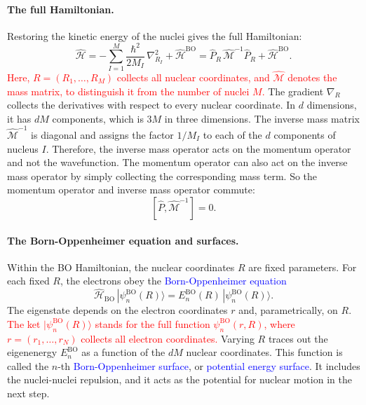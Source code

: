 \documentclass[11pt]{article}      %
\numberwithin{equation}{section}   %
\begin{document}
\paragraph{The full Hamiltonian.}
Restoring the kinetic energy of the nuclei gives the full Hamiltonian:
\begin{equation}
    \boxed{
        \hat{\mathcal{H}}
        = -\sum_{I=1}^{M}\frac{\hbar^2}{2M_I}\,\nabla_{R_I}^{2}
        +\hat{\mathcal{H}}^{\mathrm{BO}} 
        = \hat{P}_R\,\hat{\mathcal{M}}^{-1}\hat{P}_R
        +\hat{\mathcal{H}}^{\mathrm{BO}}.
    }
\end{equation}
\textcolor{red}{Here, $R=(R_1,\ldots,R_M)$ collects all nuclear coordinates,
and $\hat{\mathcal{M}}$ denotes the mass matrix, to distinguish it from the number of
nuclei $M$.} The gradient $\nabla_R$ collects the derivatives with respect to
every nuclear coordinate. In $d$ dimensions, it has $dM$ components, which is
$3M$ in three dimensions. The inverse mass matrix $\hat{\mathcal{M}}^{-1}$ is
diagonal and assigns the factor $1/M_I$ to each of the $d$ components of
nucleus $I$. Therefore, the inverse mass operator acts on the momentum operator and not the wavefunction. The momentum operator can also act on the inverse mass operator by simply collecting the corresponding mass term. So the momentum operator and inverse mass operator commute:
\begin{equation}
    \boxed{
        [\hat{P}, \hat{\mathcal{M}}^{-1}] = 0.
    }
\end{equation}

\paragraph{The Born-Oppenheimer equation and surfaces.}
Within the BO Hamiltonian, the nuclear coordinates $R$ are fixed parameters.
For each fixed $R$, the electrons obey the \textcolor{blue}{Born-Oppenheimer
equation}
\begin{equation}
    \boxed{\hat{\mathcal{H}}_{\mathrm{BO}}\,|\psi^{\mathrm{BO}}_n(R)\rangle
    = E^{\mathrm{BO}}_n(R)\,|\psi^{\mathrm{BO}}_n(R)\rangle.}
\end{equation}
The eigenstate depends on the electron coordinates $r$ and, parametrically,
on $R$. \textcolor{red}{The ket $|\psi^{\mathrm{BO}}_n(R)\rangle$ stands for the full
function $\psi^{\mathrm{BO}}_n(r,R)$, where $r=(r_1,\ldots,r_N)$ collects all electron coordinates.} Varying $R$ traces out the eigenenergy
$E^{\mathrm{BO}}_n$ as a function of the $dM$ nuclear coordinates. This
function is called the $n$-th \textcolor{blue}{Born-Oppenheimer surface}, or
\textcolor{blue}{potential energy surface}. It includes the nuclei-nuclei
repulsion, and it acts as the potential for nuclear motion in the next step. 
\end{document}
